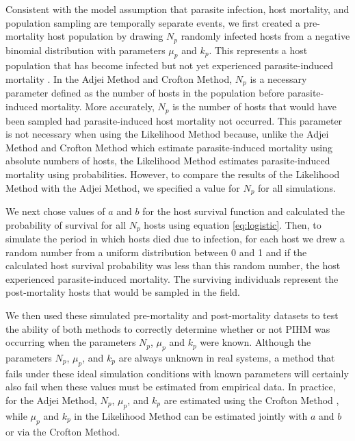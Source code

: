 \documentclass[12pt, a4paper]{article}
\begin{document}
Consistent with the model assumption that parasite infection, host mortality, and population sampling are temporally separate events, we first created a pre-mortality host population by drawing $N_p$ randomly infected hosts from a
negative binomial distribution with parameters $\mu_p$ and $k_p$. This represents a host population that has become infected but not yet experienced parasite-induced mortality \citep{Adjei1986}.  In the Adjei Method and Crofton Method, $N_p$ is a necessary parameter defined as the number of hosts in the population before parasite-induced mortality. More accurately, $N_p$  is the number of hosts that would have been sampled had parasite-induced host mortality not occurred.  This parameter is not necessary when using the Likelihood Method because, unlike the Adjei Method and Crofton Method which estimate parasite-induced mortality using absolute numbers of hosts, the Likelihood Method estimates parasite-induced mortality using probabilities. However, to compare the results of the Likelihood Method with the Adjei Method, we specified a value for $N_p$ for all simulations.

We next chose values of $a$ and $b$ for the host survival function and calculated the probability of survival
for all $N_p$ hosts using equation \ref{eq:logistic}.  Then, to simulate the period in which hosts died due to infection, for each host we drew a random number from a uniform distribution
between 0 and 1 and if the calculated host survival probability was less than this random
number, the host experienced parasite-induced mortality.  The surviving individuals represent the post-mortality hosts that would be sampled in the field.

We then used these simulated pre-mortality and post-mortality datasets to test the
ability of both methods to correctly determine whether or not PIHM was
occurring when the parameters $N_p$, $\mu_p$ and $k_p$ were known.  Although
the parameters $N_p$, $\mu_p$, and $k_p$ are always unknown in real systems, a
method that fails under these ideal simulation conditions with known parameters will certainly also fail when these values must be estimated from empirical data. In practice, for the Adjei Method, $N_p$, $\mu_p$,
and $k_p$ are estimated using the Crofton Method \citep{Adjei1986}, while $\mu_p$ and $k_p$ in
the Likelihood Method can be estimated jointly with $a$ and $b$ or via the
Crofton Method.
\end{document}
